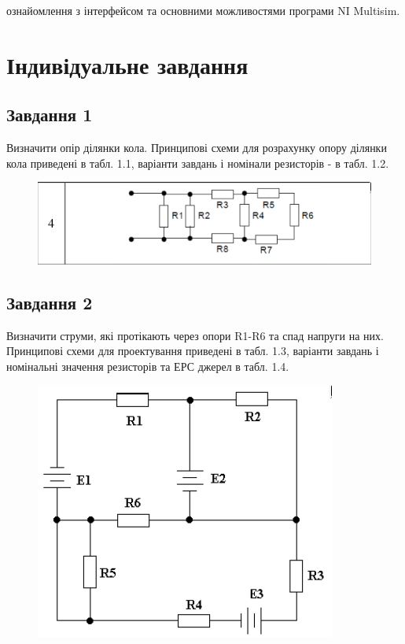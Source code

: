 \documentclass[a4paper, 12pt, oneside]{extarticle}
\begin{document}
\Margins



ознайомлення з інтерфейсом та основними можливостями
програми NI Multisim.

\section*{Індивідуальне завдання}

\subsection*{Завдання 1}

Визначити опір ділянки кола. Принципові схеми для
розрахунку опору ділянки кола приведені в табл. 1.1, варіанти завдань і
номінали резисторів -  в табл. 1.2.

\begin{figure}[h]
	\includegraphics[width=.5\textwidth]{task1}
\end{figure}

\begin{table}[h]
%
\end{table}

\subsection*{Завдання 2}

 Визначити струми, які протікають через опори R1-R6 та спад
напруги на них. Принципові схеми для проектування приведені в табл. 1.3,
варіанти завдань і номінальні значення резисторів та ЕРС джерел в табл. 1.4.

\begin{figure}[h]
	\includegraphics[width=.3\textwidth]{task2}
\end{figure}

\begin{table}[h]
%
\end{table}
\end{document}
